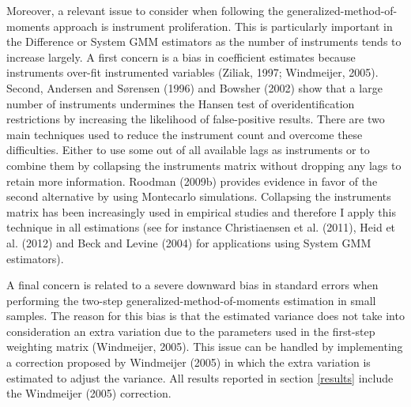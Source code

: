 \documentclass[a4paper, 12pt]{article}
\begin{document}
Moreover, a relevant issue to consider when following the generalized-method-of-moments approach is instrument proliferation. This is particularly important in the Difference or System GMM estimators as the number of instruments tends to increase largely. A first concern is a bias in coefficient estimates because instruments over-fit instrumented variables (Ziliak, 1997; Windmeijer, 2005). Second, Andersen and S\o rensen (1996) and Bowsher (2002) show that a large number of instruments undermines the Hansen test of overidentification restrictions by increasing the likelihood of false-positive results. There are two main techniques used to reduce the instrument count and overcome these difficulties. Either to use some out of all available lags as instruments or to combine them by collapsing the instruments matrix without dropping any lags to retain more information. Roodman (2009b) provides evidence in favor of the second alternative by using Montecarlo simulations. Collapsing the instruments matrix has been increasingly used in empirical studies and therefore I apply this technique in all estimations (see for instance Christiaensen et al. (2011), Heid et al. (2012) and Beck and Levine (2004) for applications using System GMM estimators).

A final concern is related to a severe downward bias in standard errors when performing the two-step generalized-method-of-moments estimation in small samples. The reason for this bias is that the estimated variance does not take into consideration an extra variation due to the parameters used in the first-step weighting matrix (Windmeijer, 2005). This issue can be handled by implementing a correction proposed by Windmeijer (2005) in which the extra variation is estimated to adjust the variance. All results reported in section \ref{results} include the Windmeijer (2005) correction.

\newpage
\end{document}

